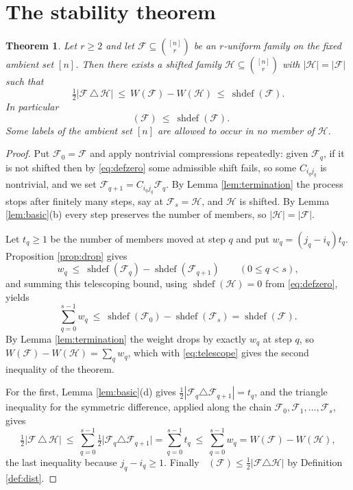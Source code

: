 \documentclass[11pt,reqno]{amsart}
\theoremstyle{plain}
\newtheorem{theorem}{Theorem}[section]
\theoremstyle{definition}
\DeclareMathOperator{\shdef}{shdef}
\DeclareMathOperator{\dsh}{dist_{sh}}
\newcommand{\F}{\mathcal{F}}
\newcommand{\HH}{\mathcal{H}}
\begin{document}
\section{The stability theorem}\label{sec:stability}

\begin{theorem}\label{thm:stability}
Let $r\ge2$ and let $\F\subseteq\binom{[n]}{r}$ be an $r$-uniform family on the fixed ambient set
$[n]$. Then there exists a shifted family $\HH\subseteq\binom{[n]}{r}$ with $|\HH|=|\F|$ such that
\[
\tfrac12\bigl|\F\,\triangle\,\HH\bigr|\ \le\ W(\F)-W(\HH)\ \le\ \shdef(\F).
\]
In particular
\[
\dsh(\F)\ \le\ \shdef(\F).
\]
Some labels of the ambient set $[n]$ are allowed to occur in no member of $\HH$.
\end{theorem}

\begin{proof}
Put $\F_0=\F$ and apply nontrivial compressions repeatedly: given $\F_q$, if it is not shifted then
by \eqref{eq:defzero} some admissible shift fails, so some $C_{i_qj_q}$ is nontrivial, and we set
$\F_{q+1}=C_{i_qj_q}\F_q$. By Lemma \ref{lem:termination} the process stops after finitely many
steps, say at $\F_s=\HH$, and $\HH$ is shifted. By Lemma \ref{lem:basic}(b) every step preserves the
number of members, so $|\HH|=|\F|$.

Let $t_q\ge1$ be the number of members moved at step $q$ and put $w_q=(j_q-i_q)t_q$. Proposition
\ref{prop:drop} gives
\[
w_q\ \le\ \shdef(\F_q)-\shdef(\F_{q+1})\qquad(0\le q<s),
\]
and summing this telescoping bound, using $\shdef(\HH)=0$ from \eqref{eq:defzero}, yields
\begin{equation}\label{eq:telescope}
\sum_{q=0}^{s-1}w_q\ \le\ \shdef(\F_0)-\shdef(\F_s)=\shdef(\F).
\end{equation}
By Lemma \ref{lem:termination} the weight drops by exactly $w_q$ at step $q$, so
$W(\F)-W(\HH)=\sum_{q}w_q$, which with \eqref{eq:telescope} gives the second inequality of the
theorem.

For the first, Lemma \ref{lem:basic}(d) gives $\tfrac12|\F_q\triangle\F_{q+1}|=t_q$, and the
triangle inequality for the symmetric difference, applied along the chain
$\F_0,\F_1,\dots,\F_s$, gives
\[
\tfrac12\bigl|\F\,\triangle\,\HH\bigr|\ \le\ \sum_{q=0}^{s-1}\tfrac12\bigl|\F_q\triangle\F_{q+1}\bigr|
=\sum_{q=0}^{s-1}t_q\ \le\ \sum_{q=0}^{s-1}w_q = W(\F)-W(\HH),
\]
the last inequality because $j_q-i_q\ge1$. Finally $\dsh(\F)\le\tfrac12|\F\triangle\HH|$ by
Definition \ref{def:dist}.
\end{proof}
\end{document}
